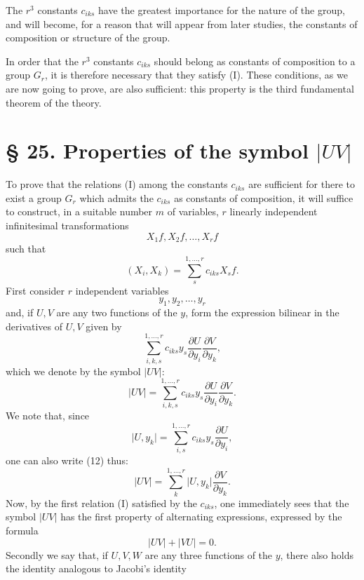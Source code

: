 \documentclass[11pt]{book}
\begin{document}
The $r^3$ constants $c_{iks}$ have the greatest importance for the nature of the group, and will become, for a reason that will appear from later studies, the constants of composition or structure of the group.

In order that the $r^3$ constants $c_{iks}$ should belong as constants of composition to a group $G_r$, it is therefore necessary that they satisfy (I). These conditions, as we are now going to prove, are also sufficient: this property is the third fundamental theorem of the theory.

\section*{\S{} 25. Properties of the symbol $\lvert UV\rvert$}

To prove that the relations (I) among the constants $c_{iks}$ are sufficient for there to exist a group $G_r$ which admits the $c_{iks}$ as constants of composition, it will suffice to construct, in a suitable number $m$ of variables, $r$ linearly independent infinitesimal transformations
\[
 X_1f,
 X_2f,
 \ldots,
 X_rf
\]
such that
\[
 (X_i,X_k)=\sum\limits_s^{1,\ldots,r}c_{iks}X_sf.
\]
First consider $r$ independent variables
\[
 y_1,y_2,\ldots,y_r
\]
and, if $U,V$ are any two functions of the $y$, form the expression bilinear in the derivatives of $U,V$ given by
\[
 \sum\limits_{i,k,s}^{1,\ldots,r}c_{iks}y_s
       \frac{\partial U}{\partial y_i}\frac{\partial V}{\partial y_k},
\]
which we denote by the symbol $\lvert UV\rvert$:
\begin{equation*}\tag{12}
 \lvert UV\rvert=
 \sum\limits_{i,k,s}^{1,\ldots,r}c_{iks}y_s
       \frac{\partial U}{\partial y_i}\frac{\partial V}{\partial y_k}.
\end{equation*}
We note that, since
\[
 \lvert U,y_k\rvert=\sum\limits_{i,s}^{1,\ldots,r}c_{iks}y_s\frac{\partial U}{\partial y_i},
\]
one can also write (12) thus:
\begin{equation*}\tag{12*}
 \lvert UV\rvert=\sum\limits_k^{1,\ldots,r}\lvert U,y_k\rvert
                 \frac{\partial V}{\partial y_k}.
\end{equation*}
Now, by the first relation (I) satisfied by the $c_{iks}$, one immediately sees that the symbol $\lvert UV\rvert$ has the first property of alternating expressions, expressed by the formula
\begin{equation*}\tag{13}
 \lvert UV\rvert+\lvert VU\rvert=0.
\end{equation*}
Secondly we say that, if $U,V,W$ are any three functions of the $y$, there also holds the identity analogous to Jacobi's identity
\end{document}
